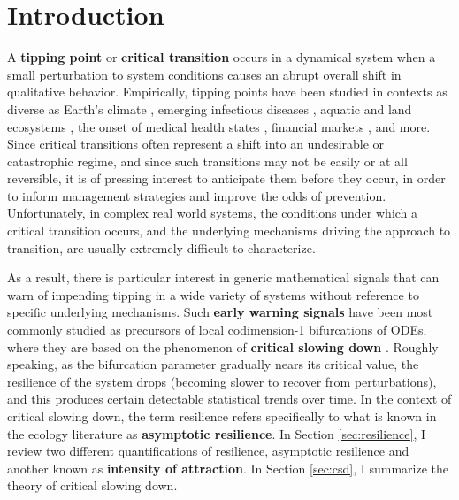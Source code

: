 
\section{Introduction}
\label{sec:intro}

A \textbf{tipping point} or \textbf{critical transition} occurs in a dynamical system when a small perturbation to system conditions causes an abrupt overall shift in qualitative behavior. 
%
Empirically, tipping points have been studied in contexts as diverse as 
Earth's climate \cite{lentonTippingElementsEarth2008, dakosSlowingEarlyWarning2008a}, 
emerging infectious diseases \cite{brettDynamicalFootprintsEnable2020}, 
aquatic and land ecosystems \cite{schefferCatastrophicShiftsEcosystems2001a, carpenterRisingVarianceLeading2006}, 
the onset of medical health states \cite{mcsharryPredictionEpilepticSeizures2003, venegasSelforganizedPatchinessAsthma2005}, 
financial markets \cite{gatfaouiFlickeringInformationSpreading2019},
and more. %
%
Since critical transitions often represent a shift into an undesirable or catastrophic regime, and since such transitions may not be easily or at all reversible, %
it is of pressing interest to anticipate them before they occur, in order to inform management strategies and improve the odds of prevention. Unfortunately, in complex real world systems, the conditions under which a critical transition occurs, and the underlying mechanisms driving the approach to transition, are usually extremely difficult to characterize.

As a result, there is particular interest in generic mathematical signals that can warn of impending tipping in a wide variety of systems without reference to specific underlying mechanisms. Such \textbf{early warning signals} have been most commonly studied as precursors of local codimension-1 bifurcations of ODEs, where they are based on the phenomenon of \textbf{critical slowing down} \cite{schefferEarlywarningSignalsCritical2009a}. Roughly speaking, as the bifurcation parameter gradually nears its critical value, the resilience of the system drops (becoming slower to recover from perturbations), and this produces certain detectable statistical trends over time. In the context of critical slowing down, the term resilience refers specifically to what is known in the ecology literature as \textbf{asymptotic resilience}. In Section \ref{sec:resilience}, I review two different quantifications of resilience, asymptotic resilience and another known as \textbf{intensity of attraction}. In Section \ref{sec:csd}, I summarize the theory of critical slowing down. 

